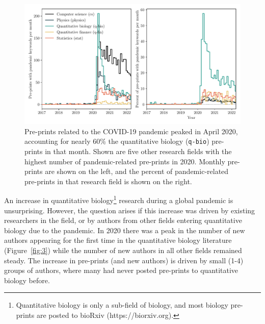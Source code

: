 \documentclass[]{rsos}%
\begin{document}
\begin{figure}
 \includegraphics[width=\linewidth]{pandemic-related-preprints}
\caption{Pre-prints related to the COVID-19 pandemic peaked in April 2020, accounting for nearly 60\% the quantitative biology (\texttt{q-bio}) pre-prints in that month. Shown are five other research fields with the highest number of pandemic-related pre-prints in 2020. Monthly pre-prints are shown on the left, and the percent of pandemic-related pre-prints in that research field is shown on the right.}
\label{fig:2}
\end{figure}
 
\renewcommand{\thefootnote}{$\dagger$} 
 
An increase in quantitative biology\footnote{Quantitative biology is only a sub-field of biology, and most biology pre-prints are posted to bioRxiv ({https://biorxiv.org}).} research during a global pandemic is unsurprising. However, the question arises if this increase was driven by existing researchers in the field, or by authors from other fields entering quantitative biology due to the pandemic. In 2020 there was a peak in the number of new authors appearing for the first time in the quantitative biology literature (Figure~\ref{fig:3}) while the number of new authors in all other fields remained steady. The increase in pre-prints (and new authors) is driven by small (1-4) groups of authors, where many had never posted pre-prints to quantitative biology before.
\end{document}
